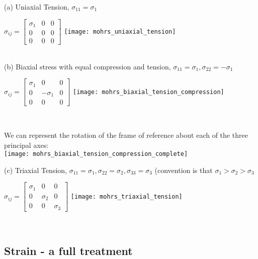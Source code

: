 (a) Uniaxial Tension, $\sigma_{11} = \sigma_{1}$

\begin{annotation}
$\sigma_{ij} = \begin{bmatrix}
\sigma_1 & 0 & 0 \\
0 & 0 & 0 \\
0 & 0 & 0
\end{bmatrix}$  \qquad \texttt{[image: mohrs\_uniaxial\_tension]}
\end{annotation}
\\

(b) Biaxial stress with equal compression and tension, $\sigma_{11} = \sigma_1, \sigma_{22}=-\sigma_1$

\begin{annotation}
$\sigma_{ij} = \begin{bmatrix}
\sigma_1 & 0 & 0 \\
0 & -\sigma_1 & 0 \\
0 & 0 & 0
\end{bmatrix}$  \qquad \texttt{[image: mohrs\_biaxial\_tension\_compression]}
\end{annotation}
\\
\begin{annotation}


We can represent the rotation of the frame of reference about each of the three principal axes:\\
{\hspace{4cm}\texttt{[image: mohrs\_biaxial\_tension\_compression\_complete]}}
\end{annotation}

(c) Triaxial Tension, $\sigma_{11}=\sigma_1, \sigma_{22}=\sigma_2, \sigma_{33}=\sigma_3$ (convention is that $\sigma_1>\sigma_2>\sigma_3$


\begin{annotation}
$\sigma_{ij} = \begin{bmatrix}
\sigma_1 & 0 & 0 \\
0 & \sigma_2 & 0 \\
0 & 0 & \sigma_3
\end{bmatrix}$  \qquad \texttt{[image: mohrs\_triaxial\_tension]}
\end{annotation}
\\



\subsection{Strain - a full treatment}

